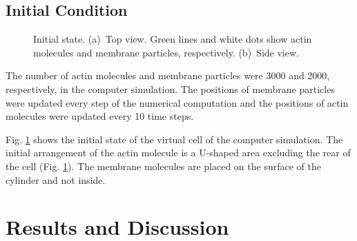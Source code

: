 \documentclass[a4paper,12pt, oneside]{book}
\begin{document}
\section{Initial Condition}
\begin{figure}[tbp]
\centering
  \caption{Initial state. (a)~Top view. Green lines and white dots show actin molecules and membrane particles, respectively. (b)~Side view.}
 \label{fig:ini}
\end{figure}
The number of actin molecules and membrane particles were 3000 and 2000, respectively, in the computer simulation.
The positions of membrane particles were updated every step of the numerical computation and the positions of actin molecules were updated every 10 time steps.

Fig. \ref{fig:ini} shows the initial state of the virtual cell of  the computer simulation.
The initial arrangement of the actin molecule is a U-shaped area excluding the rear of the cell (Fig. \ref{fig:ini}).
The membrane molecules are placed on the surface of the cylinder and not inside.

\chapter{Results and Discussion}
\end{document}
